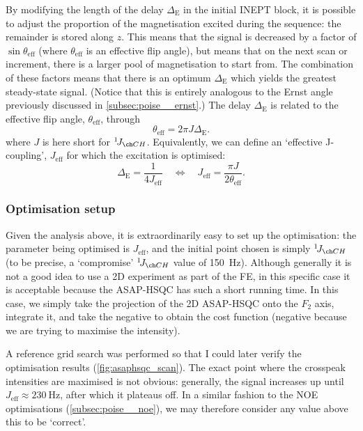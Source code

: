 By modifying the length of the delay $\Delta_\text{E}$ in the initial INEPT block, it is possible to adjust the proportion of the  magnetisation excited during the sequence: the remainder is stored along $z$.
This means that the signal is decreased by a factor of $\sin\theta_\text{eff}$ (where $\theta_\text{eff}$ is an effective flip angle), but means that on the next scan or increment, there is a larger pool of  magnetisation to start from.
The combination of these factors means that there is an optimum $\Delta_\text{E}$ which yields the greatest steady-state signal.
(Notice that this is entirely analogous to the Ernst angle previously discussed in \cref{subsec:poise__ernst}.)
The delay $\Delta_\text{E}$ is related to the effective flip angle, $\theta_\text{eff}$, through
\begin{equation}
    \label{eq:asaphsqc_ernst_angle}
    \theta_\text{eff} = 2\pi J \Delta_\text{E}.
\end{equation}
where $J$ is here short for $\oneJ{CH}$.
Equivalently, we can define an `effective J-coupling', $J_\text{eff}$ for which the excitation is optimised:
\begin{equation}
    \label{eq:asaphsqc_j_eff}
    \Delta_\text{E} = \frac{1}{4 J_\text{eff}} \quad\Longleftrightarrow\quad J_\text{eff} = \frac{\pi J}{2\theta_\text{eff}}.
\end{equation}


\subsubsection{Optimisation setup}

Given the analysis above, it is extraordinarily easy to set up the optimisation: the parameter being optimised is $J_\text{eff}$, and the initial point chosen is simply $\oneJ{CH}$ (to be precise, a `compromise' $\oneJ{CH}$ value of \qty{150}{\Hz}).
Although generally it is not a good idea to use a 2D experiment as part of the FE, in this specific case it is acceptable because the ASAP-HSQC has such a short running time.
In this case, we simply take the projection of the 2D ASAP-HSQC onto the $F_2$ axis, integrate it, and take the negative to obtain the cost function (negative because we are trying to maximise the intensity).

A reference grid search was performed so that I could later verify the optimisation results (\cref{fig:asaphsqc_scan}).
The exact point where the crosspeak intensities are maximised is not obvious: generally, the signal increases up until $J_\text{eff} \approx \qty{230}{\Hz}$, after which it plateaus off.
In a similar fashion to the NOE optimisations (\cref{subsec:poise__noe}), we may therefore consider any value above this to be `correct'.

